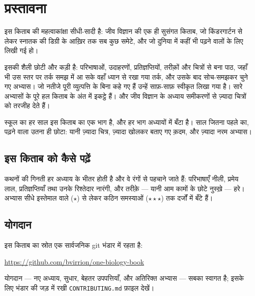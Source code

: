 \chapter{प्रस्तावना}

इस किताब की महत्वाकांक्षा सीधी-सादी है: जीव विज्ञान की एक ही सुसंगत किताब,
जो किंडरगार्टन से लेकर स्नातक की डिग्री के आख़िर तक सब कुछ समेटे, और जो
दुनिया में कहीं भी पढ़ने वालों के लिए लिखी गई हो।

इसकी शैली छोटी और कड़ी है: परिभाषाओं, उदाहरणों, प्रतिज्ञप्तियों, तरीक़ों
और चित्रों से बना पाठ, जहाँ भी उस स्तर पर तर्क समझ में आ सके वहाँ ध्यान
से रखा गया तर्क, और उसके बाद सोच-समझकर चुने गए अभ्यास। जो नतीजे पूरी
व्युत्पत्ति के बिना कहे गए हैं उन्हें साफ़-साफ़ स्वीकृत लिखा गया है। सारे
अभ्यासों के पूरे हल किताब के अंत में इकट्ठे हैं। और जीव विज्ञान के अध्याय
समीकरणों से ज़्यादा चित्रों को तरजीह देते हैं।

स्कूल का हर साल इस किताब का एक भाग है, और हर भाग अध्यायों में बँटा है।
साल जितना पहले का, पढ़ने वाला उतना ही छोटा: यानी ज़्यादा चित्र, ज़्यादा
खोलकर बताए गए क़दम, और ज़्यादा नरम अभ्यास।

\section*{इस किताब को कैसे पढ़ें}

कथनों की गिनती हर अध्याय के भीतर होती है और वे रंगों से पहचाने जाते हैं:
परिभाषाएँ नीली, प्रमेय लाल, प्रतिज्ञप्तियाँ तथा उनके रिश्तेदार नारंगी, और
तरीक़े --- यानी आम कामों के छोटे नुस्ख़े --- हरे। अभ्यास सीधे इस्तेमाल
वाले ($\star$) से लेकर कठिन समस्याओं ($\star\star\star$) तक दर्जों में
बँटे हैं।

\section*{योगदान}

इस किताब का स्रोत एक सार्वजनिक git भंडार में रहता है:
\begin{center}
\url{https://github.com/bvirrion/one-biology-book}
\end{center}
योगदान --- नए अध्याय, सुधार, बेहतर उपपत्तियाँ, और अतिरिक्त अभ्यास ---
सबका स्वागत है; इसके लिए भंडार की जड़ में रखी \texttt{CONTRIBUTING.md}
फ़ाइल देखें।
